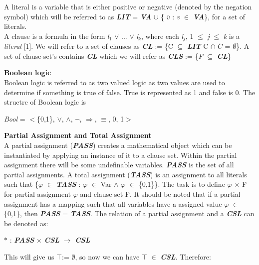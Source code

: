 \documentclass[11pt,a4paper]{article}
\begin{document}
A literal is a variable that is either positive or negative (denoted by the negation symbol) which will be referred to as \textbf{\textit{LIT}} =  \textit{\textbf{VA}} $\cup$ \{ \textit{$\bar{v}$} : \textit{v} $\in$ \textbf{\textit{VA}}\}, for a set of literals.\\

A clause is a formula in the form \textit{l$_1$} $\lor$ ... $\lor$ \textit{l$_k$}, where each \textit{l$_j$}, 1 $\le$ \textit{j} $\le$ \textit{k} is a \textit{literal} [1]. We will refer to a set of clauses as \textbf{\textit{CL}} := \{C $\subseteq$ \textbf{\textit{LIT}} C $\cap$ $\bar{C}$ = $\emptyset$\}. A set of clause-set's contains \textbf{\textit{CL}} which we will refer as \textbf{\textit{CLS}} := \{\textit{F} $\subseteq$ \textit{\textbf{CL}}\}  
\newline

\textbf{Boolean logic}\\
Boolean logic is referred to as two valued logic as two values are used to determine if something is true of false. True is represented as 1 and false is 0. The structre of Boolean logic is
\begin{center}
\textit{Bool} = $<$\{0,1\}, $\lor$, $\land$, $\neg$, $\Rightarrow$, $\equiv$, 0, 1$>$
\end{center}

\textbf{Partial Assignment and Total Assignment}\\
\indent A partial assignment (\textbf{\textit{PASS}}) creates a mathematical object which can be instantiated by applying an instance of it to a clause set. Within the partial assignment there will be some undefinable variables. \textbf{\textit{PASS}} is the set of all partial assignments. 
A total assignment (\textbf{\textit{TASS}}) is an assignment to all literals such that \{\textit{$\varphi$} $\in$ \textbf{\textit{TASS}} : \textit{$\varphi$} $\in$ Var $\land$ \textit{$\varphi$} $\in$ \{0,1\}\}. The task is to define $\varphi$ $\times$ F for partial assignment $\varphi$ and clause set F. It should be noted that if a partial assignment has a mapping such that all variables have a assigned value \textit{$\varphi$} $\in$
\{0,1\}, then \textbf{\textit{PASS}} = \textbf{\textit{TASS}}. 
The relation of a partial assignment and a \textbf{\textit{CSL}} can be denoted as: \newline
 
\begin{center}
$\ast$ : \textbf{\textit{PASS}} $\times$ \textbf{\textit{CSL}} $\rightarrow$ \textbf{\textit{CSL}}
\end{center}
This will give us $\top$:= $\emptyset$, so now we can have $\top$ $\in$ \textbf{\textit{CSL}}. Therefore:
\end{document}
